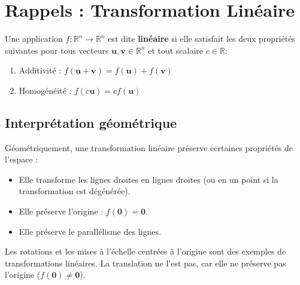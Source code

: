 \section{Rappels : Transformation Linéaire}
\begin{definition}
Une application \( f: \mathbb{R}^n \to \mathbb{R}^n \) est dite \textbf{linéaire} si elle satisfait les deux propriétés suivantes pour tous vecteurs \( \mathbf{u}, \mathbf{v} \in \mathbb{R}^n \) et tout scalaire \( c \in \mathbb{R} \):
\begin{enumerate}
    \item Additivité : \( f(\mathbf{u} + \mathbf{v}) = f(\mathbf{u}) + f(\mathbf{v}) \)
    \item Homogénéité : \( f(c\mathbf{u}) = c f(\mathbf{u}) \)
\end{enumerate}
\end{definition}
\subsection{Interprétation géométrique}
Géométriquement, une transformation linéaire préserve certaines propriétés de l'espace :
\begin{itemize}
    \item Elle transforme les lignes droites en lignes droites (ou en un point si la transformation est dégénérée).
    \item Elle préserve l'origine : \( f(\mathbf{0}) = \mathbf{0} \).
    \item Elle préserve le parallélisme des lignes.
\end{itemize}
Les rotations et les mises à l'échelle centrées à l'origine sont des exemples de transformations linéaires. La translation ne l'est pas, car elle ne préserve pas l'origine (\( f(\mathbf{0}) \neq \mathbf{0} \)).
